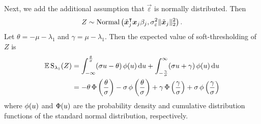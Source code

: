 
Next, we add the additional assumption that \(\vec{\varepsilon}\) is normally distributed. Then
\[
  Z \sim \operatorname{Normal}\left(\tilde{\boldsymbol{x}}_j^\intercal\boldsymbol{x}_j \beta_j, \sigma_\varepsilon^2 \lVert \tilde{\boldsymbol{x}}_j\rVert_2^2 \right).
\]
Let \(\theta = -\mu -\lambda_1 \) and \(\gamma = \mu - \lambda_1\). Then the expected value of soft-thresholding of \(Z\) is
\begin{align}
  \mathbb{E} \operatorname{S}_{\lambda_1}(Z) & = \int_{-\infty}^\frac{\theta}{\sigma} (\sigma u - \theta) \operatorname{\phi}(u) \mathop{}\!\mathrm{d} u + \int_{-\frac{\gamma}{\sigma}}^\infty (\sigma u + \gamma) \operatorname{\phi}(u) \mathop{}\!\mathrm{d} u                                               \nonumber                      \\
                        & = -\theta \operatorname{\Phi}\left(\frac{\theta}{\sigma}\right) - \sigma \operatorname{\phi}\left(\frac{\theta}{\sigma}\right) + \gamma \operatorname{\Phi}\left(\frac{\gamma}{\sigma}\right) + \sigma \operatorname{\phi}\left(\frac{\gamma}{\sigma}\right) \label{eq:mean-centered-eval}
\end{align}
where \(\operatorname{\phi}(u)\) and \(\operatorname{\Phi}(u)\) are the probability density and cumulative distribution functions of the standard normal distribution, respectively.

